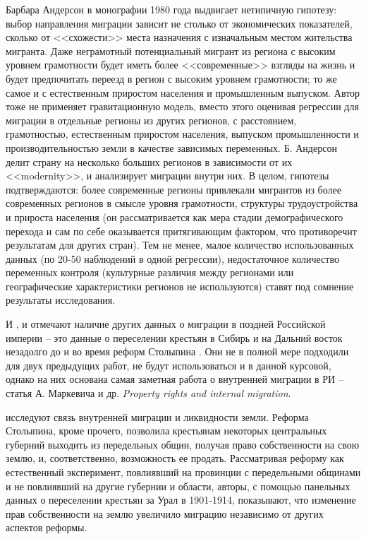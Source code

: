 \documentclass[a4paper,12pt]{article}
\begin{document}
Барбара Андерсон в монографии 1980 года выдвигает нетипичную гипотезу: выбор направления миграции зависит не столько от экономических показателей, сколько от <<схожести>> места назначения с изначальным местом жительства мигранта. Даже неграмотный потенциальный мигрант из региона с высоким уровнем грамотности будет иметь более <<современные>> взгляды на жизнь и будет предпочитать переезд в регион с высоким уровнем грамотности; то же самое и с естественным приростом населения и промышленным выпуском. Автор тоже не применяет гравитационную модель, вместо этого оценивая регрессии для миграции в отдельные регионы из других регионов, с расстоянием, грамотностью, естественным приростом населения, выпуском промышленности и производительностью земли в качестве зависимых переменных. Б. Андерсон делит страну на несколько больших регионов в зависимости от их <<modernity>>, и анализирует миграции внутри них. В целом, гипотезы подтверждаются: более современные регионы привлекали мигрантов из более современных регионов в смысле уровня грамотности, структуры трудоустройства и прироста населения (он рассматривается как мера стадии демографического перехода и сам по себе оказывается притягивающим фактором, что противоречит результатам для других стран).
Тем не менее, малое количество использованных данных (по 20-50 наблюдений в одной регрессии), недостаточное количество переменных контроля (культурные различия между регионами или географические характеристики регионов не используются) ставят под сомнение результаты исследования.


И \citeauthor{leasure_internal_1968}, и \citeauthor{anderson_internal_1980} отмечают наличие других данных о миграции в поздней Российской империи – это данные о переселении крестьян в Сибирь и на Дальний восток незадолго до и во время реформ Столыпина \citep{itogi_1910, itogi_1916}. Они не в полной мере подходили для двух предыдущих работ, не будут использоваться и в данной курсовой, однако на них основана самая заметная работа о внутренней миграции в РИ -- статья А. Маркевича и др. \emph{Property rights and internal migration}.

\citeauthor{chernina_property_2014} исследуют связь внутренней миграции и ликвидности земли. Реформа Столыпина, кроме прочего, позволила крестьянам некоторых центральных губерний выходить из передельных общин, получая право собственности на свою землю, и, соответственно, возможность ее продать. Рассматривая реформу как естественный эксперимент, повлиявший на провинции с передельными общинами и не повлиявший на другие губернии и области, авторы, с помощью панельных данных о переселении крестьян за Урал в 1901-1914, показывают, что изменение прав собственности на землю увеличило миграцию независимо от других аспектов реформы.
\end{document}
